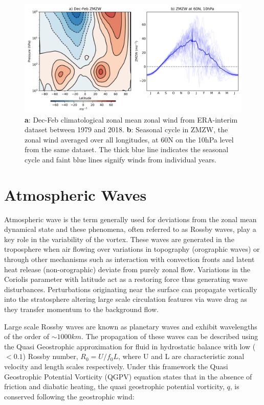 \begin{figure}[h!]
\centering
    \includegraphics[width= \linewidth]{Figures/Figures-background/ZMZW_clim_cycle_ERA.png}
    \caption[climatological ZMZW and seasonal cycle vortex ZMZW from ERA-Interim]{\textbf{a}: Dec-Feb climatological zonal mean zonal wind from ERA-interim dataset between 1979 and 2018. \textbf{b}: Seasonal cycle in ZMZW, the zonal wind averaged over all longitudes, at 60N on the 10hPa level from the same dataset. The thick blue line indicates the seasonal cycle and faint blue lines signify winds from individual years.}
    \label{fig:ERAclimDJF}
\centering
\end{figure}

\section{Atmospheric Waves}
\label{sec:atmos_waves}
Atmospheric wave is the term generally used for deviations from the zonal mean dynamical state and these phenomena, often referred to as Rossby waves, play a key role in the variability of the vortex. These waves are generated in the troposphere when air flowing over variations in topography (orographic waves) or through other mechanisms such as interaction with convection fronts and latent heat release (non-orographic) deviate from purely zonal flow. Variations in the Coriolis parameter with latitude act as a restoring force thus generating wave disturbances. Perturbations originating near the surface can propagate vertically into the stratosphere altering large scale circulation features via wave drag as they transfer momentum to the background flow. 

Large scale Rossby waves are known as planetary waves and exhibit wavelengths of the order of $\sim 1000km$. The propagation of these waves can be described using the Quasi Geostrophic approximation for fluid in hydrostatic balance with low ($<0.1$) Rossby number, $R_0 = U/f_0 L$, where U and L are characteristic zonal velocity and length scales respectively. Under this framework the Quasi Geostrophic Potential Vorticity (QGPV) equation states that in the absence of friction and diabatic heating, the quasi geostrophic potential vorticity, $q$, is conserved following the geostrophic wind:

